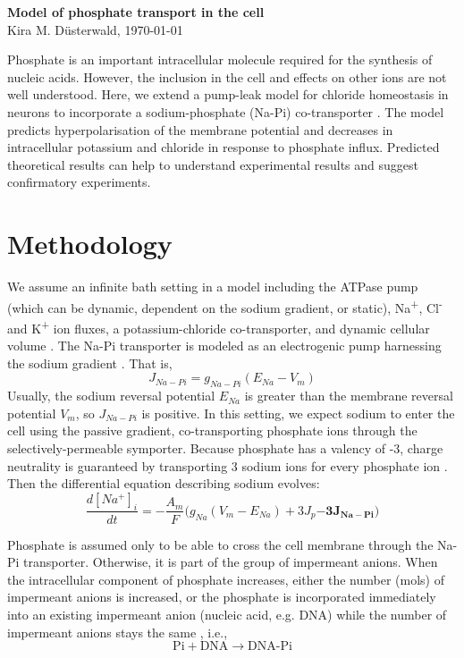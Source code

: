\documentclass[11pt]{article}[]
\begin{document}
	

\begin{center} \Large \textbf{Model of phosphate transport in the cell}\\ \vskip 2mm
\normalsize {Kira M. D\"usterwald, \today}
\end{center} 

\normalsize

Phosphate is an important intracellular molecule required for the synthesis of nucleic acids. However, the inclusion in the cell and effects on other ions are not well understood. Here, we extend a pump-leak model for chloride homeostasis in neurons to incorporate a sodium-phosphate (Na-Pi) co-transporter \cite{Dusterwald2018}. The model predicts hyperpolarisation of the membrane potential and decreases in intracellular potassium and chloride in response to phosphate influx. Predicted theoretical results can help to understand experimental results and suggest confirmatory experiments.

\section{Methodology}

We assume an infinite bath setting in a model including the ATPase pump (which can be dynamic, dependent on the sodium gradient, or static), Na\textsuperscript{+}, Cl\textsuperscript{-} and K\textsuperscript{+} ion fluxes, a potassium-chloride co-transporter, and dynamic cellular volume \cite{Dusterwald2018}. The Na-Pi transporter is modeled as an electrogenic pump harnessing the sodium gradient \cite{Levi2019}. That is,
\begin{equation}
J_{Na-Pi} = g_{Na-Pi} (E_{Na}-V_m)
\end{equation}
Usually, the sodium reversal potential $E_{Na}$ is greater than the membrane reversal potential $V_m$, so $J_{Na-Pi}$ is positive. In this setting, we expect sodium to enter the cell using the passive gradient, co-transporting phosphate ions through the selectively-permeable symporter. Because phosphate has a valency of -3, charge neutrality is guaranteed by transporting 3 sodium ions for every phosphate ion \cite{Levi2019}. Then the differential equation describing sodium evolves:
\begin{equation}
\frac{d[Na^+]_i}{dt}=-\frac{A_m}{F}\big(g_{Na}(V_m-E_{Na})+3J_p\mathbf{-3J_{Na-Pi}}\big)
\end{equation}

Phosphate is assumed only to be able to cross the cell membrane through the Na-Pi transporter. Otherwise, it is part of the group of impermeant anions. When the intracellular component of phosphate increases, either the number (mols) of impermeant anions is increased, or the phosphate is incorporated immediately into an existing impermeant anion (nucleic acid, e.g. DNA) while the number of impermeant anions stays the same \cite{Engstrom1983}, i.e., 
\begin{equation}
\text{Pi}+\text{DNA} \rightarrow \text{DNA-Pi}
\end{equation}
\end{document}
